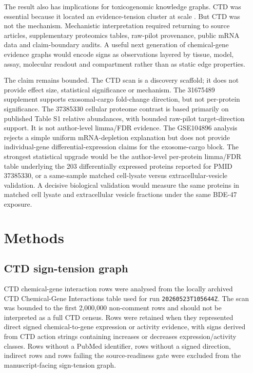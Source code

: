 \documentclass[11pt]{article}
\begin{document}
The result also has implications for toxicogenomic knowledge graphs. CTD was essential because it located an evidence-tension cluster at scale \cite{ctd2025}. But CTD was not the mechanism. Mechanistic interpretation required returning to source articles, supplementary proteomics tables, raw-pilot provenance, public mRNA data and claim-boundary audits. A useful next generation of chemical-gene evidence graphs would encode signs as observations layered by tissue, model, assay, molecular readout and compartment rather than as static edge properties.

The claim remains bounded. The CTD scan is a discovery scaffold; it does not provide effect size, statistical significance or mechanism. The 31675489 supplement supports exosomal-cargo fold-change direction, but not per-protein significance. The 37385330 cellular proteome contrast is based primarily on published Table S1 relative abundances, with bounded raw-pilot target-direction support. It is not author-level limma/FDR evidence. The GSE104896 analysis rejects a simple uniform mRNA-depletion explanation but does not provide individual-gene differential-expression claims for the exosome-cargo block. The strongest statistical upgrade would be the author-level per-protein limma/FDR table underlying the 203 differentially expressed proteins reported for PMID 37385330, or a same-sample matched cell-lysate versus extracellular-vesicle validation. A decisive biological validation would measure the same proteins in matched cell lysate and extracellular vesicle fractions under the same BDE-47 exposure.

\section{Methods}

\subsection{CTD sign-tension graph}
CTD chemical-gene interaction rows were analysed from the locally archived CTD Chemical-Gene Interactions table used for run \texttt{20260523T105644Z}. The scan was bounded to the first 2,000,000 non-comment rows and should not be interpreted as a full CTD census. Rows were retained when they represented direct signed chemical-to-gene expression or activity evidence, with signs derived from CTD action strings containing increases or decreases expression/activity classes. Rows without a PubMed identifier, rows without a signed direction, indirect rows and rows failing the source-readiness gate were excluded from the manuscript-facing sign-tension graph.
\end{document}

